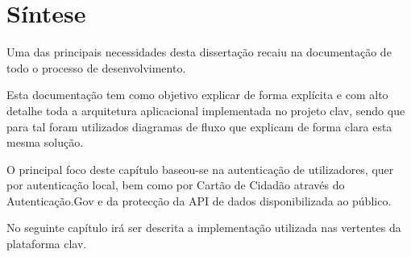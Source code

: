 \section{Síntese}

Uma das principais necessidades desta dissertação recaiu na documentação de todo o processo de desenvolvimento. 

Esta documentação tem como objetivo explicar de forma explícita e com alto detalhe toda a arquitetura aplicacional implementada no projeto \gls{clav}, sendo que para tal foram utilizados diagramas de fluxo que explicam de forma clara esta mesma solução.

O principal foco deste capítulo baseou-se na autenticação de utilizadores, quer por autenticação local, bem como por Cartão de Cidadão através do Autenticação.Gov e da protecção da API de dados disponibilizada ao público.

No seguinte capítulo irá ser descrita a implementação utilizada nas vertentes da plataforma \gls{clav}.